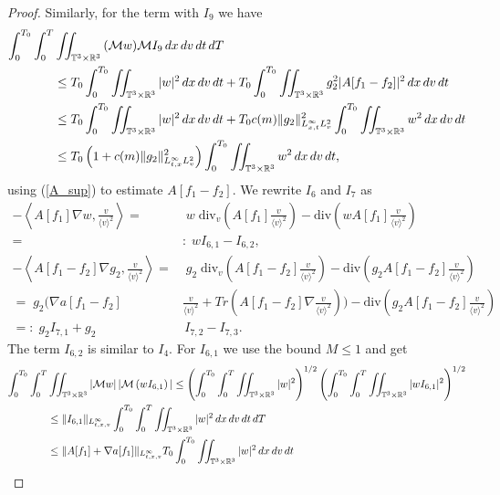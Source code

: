 \documentclass[10pt,a4paper]{amsart}
\newcommand{\CalM}{\mathcal{M}}
\newcommand{\R}{\mathbb R}
\newcommand{\T}{\mathbb{T}}
\newcommand{\abs}[1]{\left\vert#1\right\vert}
\newcommand{\dT}{\, {\rm d} T}
\newcommand{\dt}{\, {\rm d} t}
\newcommand{\dv}{\, {\rm d} v}
\newcommand{\dx}{\, {\rm d} x}
\newcommand{\vpran}[1]{\left(#1\right)}
\begin{document}
\begin{proof}
Similarly, for the term with $I_9$ we have
\begin{align*}
\int_0^{T_0}\int_0^{T} & \iint_{\T^3 \times \R^3} {({\CalM} w)  } \CalM {I_{9}} \dx\dv\dt\dT    
\\
&\le 
T_0 \int_0^{T_0} \iint_{\T^3 \times \R^3} |w| ^2 \dx\dv\dt 
+  T_0 \int_0^{T_0} \iint_{\T^3 \times \R^3}  g_2^2 | A[f_1-f_2]|^2 \dx\dv\dt 
\\
&\le 
T_0 \int_0^{T_0} \iint_{\T^3 \times \R^3} |w| ^2 \dx\dv\dt 
+  T_0 c(m) \|g_2\|^2_{L^\infty_{x,t}L_v^2} \int_0^{T_0} \iint_{\T^3 \times \R^3} w^2 \dx\dv\dt
\\
&\le T_0 \vpran{1+c(m) \|g_2\|^2_{L^\infty_{t,x}L_v^2}} \int_0^{T_0} \iint_{\T^3 \times \R^3} w^2 \dx\dv\dt,
\end{align*}
using (\ref{A_sup}) to estimate $A[f_1-f_2]$. 
We rewrite $I_6$ and $I_7$ as 
\begin{align*}
-\left  \langle A[f_1]   \nabla w ,  \frac{v}{ \langle v \rangle ^2}\right \rangle = &\;   {{w\; \textrm{div}_v\left( A[f_1] \frac{v}{ \langle v \rangle ^2}   \right)}}
- \textrm{div} \left(  w A[f_1]    \frac{v}{ \langle v \rangle ^2} \right) 
\\
=&:\; w I_{6,1}- I_{6,2},
\\
 -  \left  \langle A[f_1-f_2]   \nabla g_2 ,  \frac{v}{ \langle v \rangle ^2}\right  \rangle = &\;   {{g_2\; \textrm{div}_v\left( A[f_1-f_2] \frac{v}{ \langle v \rangle ^2}   \right)}}
- \textrm{div} \left(  g_2 A[f_1-f_2]    \frac{v}{ \langle v \rangle ^2} \right) 
\\
=\; g_2 \bigg(\nabla a [f_1-f_2] & \frac{v}{ \langle v \rangle ^2} + Tr(A[f_1-f_2] \nabla \frac{v}{ \langle v \rangle ^2})\bigg) - \textrm{div} \left(  g_2 A[f_1-f_2]    \frac{v}{ \langle v \rangle ^2} \right) 
\\
=: \;  g_2 I_{7,1} + g_2 & \, I_{7,2} -  I_{7,3}.
\end{align*}
The term $I_{6,2}$ is similar to $I_{4}$.  For $I_{6,1}$ we use the bound $ {M} \le 1$ and get
\begin{align*}
\int_0^{T_0}\int_0^{T} & \iint_{\T^3 \times \R^3} \abs{\CalM w} |{\CalM}  \vpran{w I_{6,1}}| %
\leq 
\left(\int_0^{T_0}\int_0^{T} \iint_{\T^3 \times \R^3} | w| ^2 \right)^{1/2} 
\left( \int_0^{T_0}\int_0^{T} \iint_{\T^3 \times \R^3}  |{w I_{6,1}}|^2 %
\right)^{1/2}   
\\
& \le  
\|I_{6,1}\|_{L^\infty_{t,x,v}} \int_0^{T_0}\int_0^{T} \iint_{\T^3 \times \R^3}  |w|^2 \dx\dv\dt\dT  
\\
&\le \|A[f_1] + \nabla a[f_1]\|_{L^\infty_{t,x,v}} T_0   \int_0^{T_0}\iint_{\T^3 \times \R^3}  |w| ^2 \dx\dv\dt

\end{align*}
\end{proof}
\end{document}
